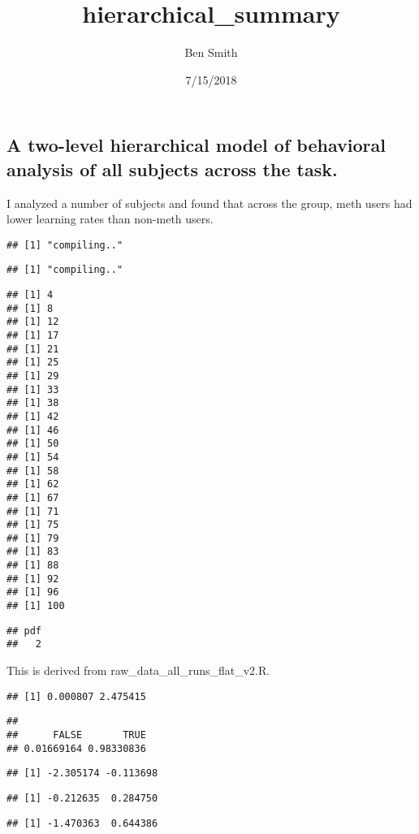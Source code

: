 \documentclass[]{article}
\title{hierarchical\_summary}
\author{Ben Smith}
\date{7/15/2018}
\begin{document}
\maketitle

\subsection{A two-level hierarchical model of behavioral analysis of all
subjects across the
task.}\label{a-two-level-hierarchical-model-of-behavioral-analysis-of-all-subjects-across-the-task.}

I analyzed a number of subjects and found that across the group, meth
users had lower learning rates than non-meth users.

\begin{verbatim}
## [1] "compiling.."
\end{verbatim}

\begin{verbatim}
## [1] "compiling.."
\end{verbatim}

\begin{verbatim}
## [1] 4
## [1] 8
## [1] 12
## [1] 17
## [1] 21
## [1] 25
## [1] 29
## [1] 33
## [1] 38
## [1] 42
## [1] 46
## [1] 50
## [1] 54
## [1] 58
## [1] 62
## [1] 67
## [1] 71
## [1] 75
## [1] 79
## [1] 83
## [1] 88
## [1] 92
## [1] 96
## [1] 100
\end{verbatim}

\begin{verbatim}
## pdf 
##   2
\end{verbatim}

This is derived from raw\_data\_all\_runs\_flat\_v2.R.

\begin{verbatim}
## [1] 0.000807 2.475415
\end{verbatim}

\begin{verbatim}
## 
##      FALSE       TRUE 
## 0.01669164 0.98330836
\end{verbatim}

\begin{verbatim}
## [1] -2.305174 -0.113698
\end{verbatim}

\begin{verbatim}
## [1] -0.212635  0.284750
\end{verbatim}

\begin{verbatim}
## [1] -1.470363  0.644386
\end{verbatim}
\end{document}
